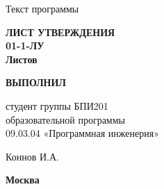 \vfill

    \textbf{\uppercase{\docTitle}}

    \bigskip

    Текст программы

    \bigskip

    \textbf{
    	\Large
    		ЛИСТ УТВЕРЖДЕНИЯ \\
    	\large
    		{\docId} 01-1-ЛУ \\
    	\normalsize
    		Листов \pageref*{LastPage}
    }

\vfill

    \makebox[0.45\textwidth]{}\hfil%
    \begin{minipage}[t]{0.45\textwidth}\centering
    	\textbf{ВЫПОЛНИЛ}
            
    	студент группы БПИ201 \\
    	образовательной программы \\
    	09.03.04 «Программная инженерия» \\
    \end{minipage}

\bigskip

    \makebox[0.45\textwidth]{}\hfil%
    \begin{minipage}[t]{0.45\textwidth}\centering
    	\placename Коннов И.А. \\
    	\placedate
    \end{minipage}

\vskip 1.5cm

    \textbf{Москва \YEAR}